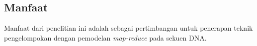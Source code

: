 \subsection*{Manfaat}
Manfaat dari penelitian ini adalah sebagai pertimbangan untuk penerapan teknik pengelompokan dengan pemodelan \textit{map-reduce} pada sekuen DNA.
